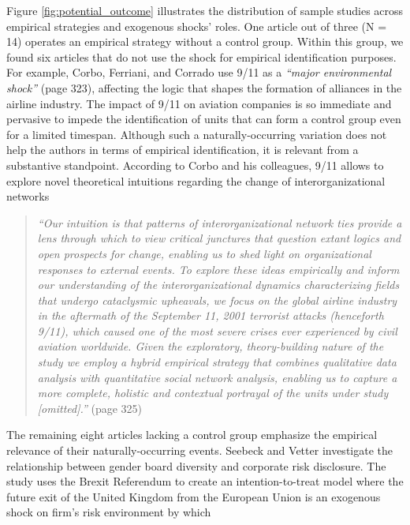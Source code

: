 \documentclass[11pt]{article}
\begin{document}
\begin{refsection}
Figure \ref{fig:potential_outcome} illustrates the distribution of sample
studies across empirical strategies and exogenous shocks' roles. One article out
of three (N = 14) operates an empirical strategy without a control group.
Within this group, we found six articles that do not use the shock for
empirical identification purposes. For example, Corbo, Ferriani, and Corrado
\autocite*{corbo2016323} use 9/11 as a \textit{``major environmental shock''}
(page 323), affecting the logic that shapes the formation of alliances in the
airline industry. The impact of 9/11 on aviation companies is so immediate and
pervasive to impede the identification of units that can form a control group
even for a limited timespan.  Although such a naturally-occurring variation does
not help the authors in terms of empirical identification, it is relevant from a
substantive standpoint. According to Corbo and his colleagues, 9/11 allows to explore
novel theoretical intuitions regarding the change of interorganizational
networks

\begin{quote}
  \textit{
    ``Our intuition is that patterns of interorganizational network ties provide
    a lens through which to view critical junctures that question extant logics
    and open prospects for change, enabling us to shed light on organizational
    responses to external events.  To explore these ideas empirically and inform
    our understanding of the interorganizational dynamics characterizing fields
    that undergo cataclysmic upheavals, we focus on the global airline industry
    in the aftermath of the September 11, 2001 terrorist attacks (henceforth
    9/11), which caused one of the most severe crises ever experienced by civil
    aviation worldwide. Given the exploratory, theory-building nature of the
    study we employ a hybrid empirical strategy that combines qualitative data
    analysis with quantitative social network analysis, enabling us to capture a
    more complete, holistic and contextual portrayal of the units under study
    [omitted].''
  }
  (page 325)
\end{quote}

The remaining eight articles lacking a control group emphasize the empirical
relevance of their naturally-occurring events. Seebeck and Vetter
\autocite*{seebeck2021} investigate the relationship between gender board
diversity and corporate risk disclosure.  The study uses the Brexit Referendum
to create an intention-to-treat model \autocite{angrist_1996} where the future
exit of the United Kingdom from the European Union is an exogenous shock on
firm's risk environment by which


\end{refsection}
\end{document}
